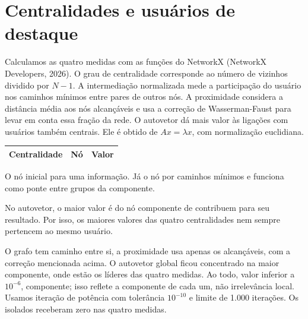 \documentclass[12pt,a4paper]{article}
\newcommand{\fonte}{\par\noindent{\fontsize{10}{12}\selectfont Fonte: elaboração própria (2026).}\par}
\begin{document}
\newpage
\section{Centralidades e usuários de destaque}
Calculamos as quatro medidas com as funções do NetworkX (NetworkX Developers,
2026). O grau de centralidade corresponde ao número de vizinhos dividido por
$N-1$. A intermediação normalizada mede a participação do usuário nos caminhos
mínimos entre pares de outros nós. A proximidade considera a distância média
aos nós alcançáveis e usa a correção de Wasserman-Faust para levar em conta
essa fração da rede. O autovetor dá mais valor às ligações com usuários também
centrais. Ele é obtido de $Ax=\lambda x$, com normalização euclidiana.

\begin{singlespace}
\begin{center}
\fontsize{10}{12}\selectfont
\begin{tabular*}{\textwidth}{@{\extracolsep{\fill}}lrr}
\toprule
\textbf{Centralidade} & \textbf{Nó} & \textbf{Valor}\\
\midrule
\bottomrule
\end{tabular*}
\end{center}
\fonte
\end{singlespace}

O nó %
inicial para uma informação. Já o nó %
por %
caminhos mínimos e funciona como ponte entre grupos da componente.

No autovetor, o maior valor é do nó %
componente de %
contribuem para seu resultado. Por isso, os maiores valores das quatro centralidades
nem sempre pertencem ao mesmo usuário.

O grafo tem %
caminho entre si, a proximidade usa apenas os alcançáveis, com a correção
mencionada acima. O autovetor global ficou concentrado na maior componente,
onde estão os líderes das quatro medidas. Ao todo, %
valor inferior a $10^{-6}$, %
componente; isso reflete a componente de cada um, não irrelevância local.
Usamos iteração de potência com tolerância $10^{-10}$ e limite de 1.000
iterações. Os isolados receberam zero nas quatro medidas.
\end{document}
